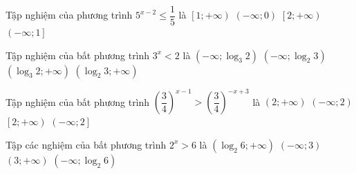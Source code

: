 

\begin{ex}%
	Tập nghiệm của phương trình ${5^{x-2}}\le \dfrac{1}{5}$  là
	 \choice
		 {$\left[1;+\infty \right)$}
		 {$\left(-\infty;0\right)$}
		{$\left[2;+\infty  \right)$}
		{\True $\left(-\infty;1\right]$} 
	 \loigiai{
		Ta  có ${5^{x-2}}\le \dfrac{1}{5}\Leftrightarrow x-2\le-1\Leftrightarrow x\le 1$.\\
		Tập  nghiệm của phương trình là $\left(-\infty;1\right]$.\\
	 }
\end{ex}

\begin{ex}%
	Tập nghiệm của  bất phương trình $3^x<2$ là
	\choice 
		{\True  $\left(-\infty;{{\log}_3}2\right)$}
		{$\left(-\infty;{{\log}_2}3\right)$} 
		{$\left({{\log}_3}2;+\infty \right)$} 
		{$\left({{\log}_2}3;+\infty  \right)$}
\end{ex}

\begin{ex}%
	Tập  nghiệm của bất phương trình $\left(\dfrac{3}{4}\right)^{x-1}>\left(\dfrac{3}{4}\right)^{-x+3}$ là
	\choice 
		{ $\left(2;+\infty\right)$} 
		{\True$\left(-\infty;2\right)$} 
		{$\left[2;+\infty\right)$} 
		 {$\left(-\infty;2\right]$}
\end{ex}

\begin{ex}%
	Tập các nghiệm của bất  phương trình $2^x>6$ là
	\choice 
		{\True $\left({{\log}_2}6;+\infty  \right)$}
		 {$\left(-\infty;3\right)$}
		{$\left(3;+\infty \right)$} 
		 {$\left(-\infty;{{\log}_2}6\right)$}
\end{ex}

